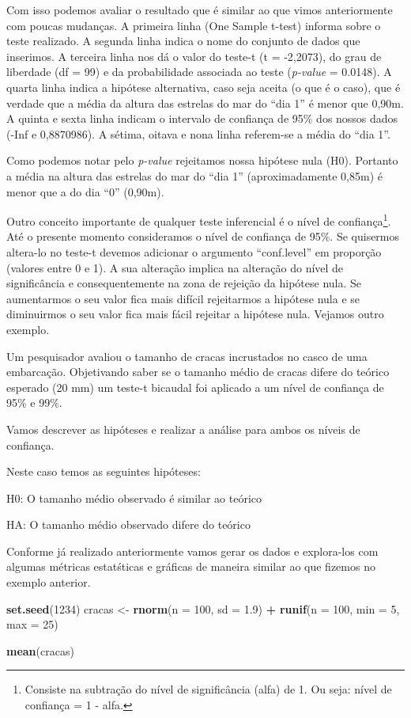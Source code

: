 \documentclass[titlepage, oneside, openany, a4paper]{book}
\newenvironment{Shaded}{\begin{snugshade}}{\end{snugshade}}
\newcommand{\DataTypeTok}[1]{\textcolor[rgb]{0.13,0.29,0.53}{#1}}
\newcommand{\DecValTok}[1]{\textcolor[rgb]{0.00,0.00,0.81}{#1}}
\newcommand{\FloatTok}[1]{\textcolor[rgb]{0.00,0.00,0.81}{#1}}
\newcommand{\KeywordTok}[1]{\textcolor[rgb]{0.13,0.29,0.53}{\textbf{#1}}}
\newcommand{\NormalTok}[1]{#1}
\newcommand{\OperatorTok}[1]{\textcolor[rgb]{0.81,0.36,0.00}{\textbf{#1}}}
\newcommand{\StringTok}[1]{\textcolor[rgb]{0.31,0.60,0.02}{#1}}
\begin{document}
Com isso podemos avaliar o resultado que é similar ao que vimos anteriormente com poucas mudanças. A primeira linha (One Sample t-test) informa sobre o teste realizado. A segunda linha indica o nome do conjunto de dados que inserimos. A terceira linha nos dá o valor do teste-t (t = -2,2073), do grau de liberdade (df = 99) e da probabilidade associada ao teste (\emph{p-value} = 0.0148). A quarta linha indica a hipótese alternativa, caso seja aceita (o que é o caso), que é verdade que a média da altura das estrelas do mar do ``dia 1'' é menor que 0,90m. A quinta e sexta linha indicam o intervalo de confiança de 95\% dos nossos dados (-Inf e 0,8870986). A sétima, oitava e nona linha referem-se a média do ``dia 1''.

Como podemos notar pelo \emph{p-value} rejeitamos nossa hipótese nula (H0). Portanto a média na altura das estrelas do mar do ``dia 1'' (aproximadamente 0,85m) é menor que a do dia ``0'' (0,90m).

Outro conceito importante de qualquer teste inferencial é o nível de confiança\footnote{Consiste na subtração do nível de significância (alfa) de 1. Ou seja: nível de confiança = 1 - alfa.}. Até o presente momento consideramos o nível de confiança de 95\%. Se quisermos altera-lo no teste-t devemos adicionar o argumento ``conf.level'' em proporção (valores entre 0 e 1). A sua alteração implica na alteração do nível de significância e consequentemente na zona de rejeição da hipótese nula. Se aumentarmos o seu valor fica mais difícil rejeitarmos a hipótese nula e se diminuirmos o seu valor fica mais fácil rejeitar a hipótese nula. Vejamos outro exemplo.

Um pesquisador avaliou o tamanho de cracas incrustados no casco de uma embarcação. Objetivando saber se o tamanho médio de cracas difere do teórico esperado (20 mm) um teste-t bicaudal foi aplicado a um nível de confiança de 95\% e 99\%.

Vamos descrever as hipóteses e realizar a análise para ambos os níveis de confiança.

Neste caso temos as seguintes hipóteses:

H0: O tamanho médio observado é similar ao teórico

HA: O tamanho médio observado difere do teórico

Conforme já realizado anteriormente vamos gerar os dados e explora-los com algumas métricas estatśticas e gráficas de maneira similar ao que fizemos no exemplo anterior.

\begin{Shaded}
\begin{Highlighting}[]
\KeywordTok{set.seed}\NormalTok{(}\DecValTok{1234}\NormalTok{)}
\NormalTok{cracas <-}\StringTok{ }\KeywordTok{rnorm}\NormalTok{(}\DataTypeTok{n =} \DecValTok{100}\NormalTok{, }\DataTypeTok{sd =} \FloatTok{1.9}\NormalTok{) }\OperatorTok{+}\StringTok{ }\KeywordTok{runif}\NormalTok{(}\DataTypeTok{n =} \DecValTok{100}\NormalTok{, }\DataTypeTok{min =} \DecValTok{5}\NormalTok{, }\DataTypeTok{max =} \DecValTok{25}\NormalTok{)}

\KeywordTok{mean}\NormalTok{(cracas)}
\end{Highlighting}
\end{Shaded}
\end{document}
